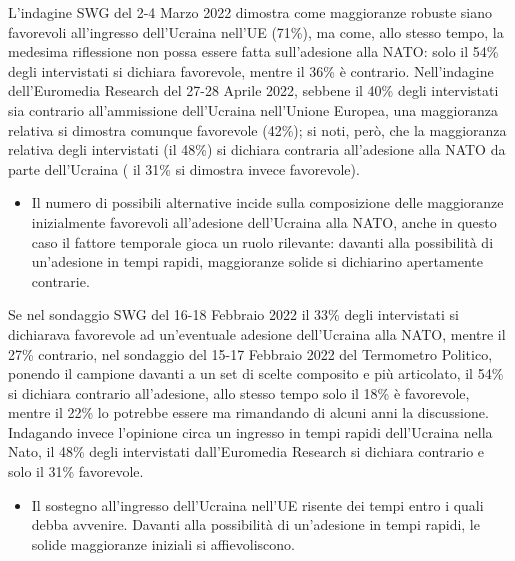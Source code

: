 \documentclass[
  openany]{book}
\providecommand{\tightlist}{%
  \setlength{\itemsep}{0pt}\setlength{\parskip}{0pt}}
\begin{document}
L'indagine SWG del 2-4 Marzo 2022 dimostra come maggioranze robuste siano favorevoli all'ingresso dell'Ucraina nell'UE (71\%), ma come, allo stesso tempo, la medesima riflessione non possa essere fatta sull'adesione alla NATO: solo il 54\% degli intervistati si dichiara favorevole, mentre il 36\% è contrario. Nell'indagine dell'Euromedia Research del 27-28 Aprile 2022, sebbene il 40\% degli intervistati sia contrario all'ammissione dell'Ucraina nell'Unione Europea, una maggioranza relativa si dimostra comunque favorevole (42\%); si noti, però, che la maggioranza relativa degli intervistati (il 48\%) si dichiara contraria all'adesione alla NATO da parte dell'Ucraina ( il 31\% si dimostra invece favorevole).

\begin{itemize}
\tightlist
\item
  Il numero di possibili alternative incide sulla composizione delle maggioranze inizialmente favorevoli all'adesione dell'Ucraina alla NATO, anche in questo caso il fattore temporale gioca un ruolo rilevante: davanti alla possibilità di un'adesione in tempi rapidi, maggioranze solide si dichiarino apertamente contrarie.
\end{itemize}

Se nel sondaggio SWG del 16-18 Febbraio 2022 il 33\% degli intervistati si dichiarava favorevole ad un'eventuale adesione dell'Ucraina alla NATO, mentre il 27\% contrario, nel sondaggio del 15-17 Febbraio 2022 del Termometro Politico, ponendo il campione davanti a un set di scelte composito e più articolato, il 54\% si dichiara contrario all'adesione, allo stesso tempo solo il 18\% è favorevole, mentre il 22\% lo potrebbe essere ma rimandando di alcuni anni la discussione. Indagando invece l'opinione circa un ingresso in tempi rapidi dell'Ucraina nella Nato, il 48\% degli intervistati dall'Euromedia Research si dichiara contrario e solo il 31\% favorevole.

\begin{itemize}
\tightlist
\item
  Il sostegno all'ingresso dell'Ucraina nell'UE risente dei tempi entro i quali debba avvenire. Davanti alla possibilità di un'adesione in tempi rapidi, le solide maggioranze iniziali si affievoliscono.
\end{itemize}
\end{document}
